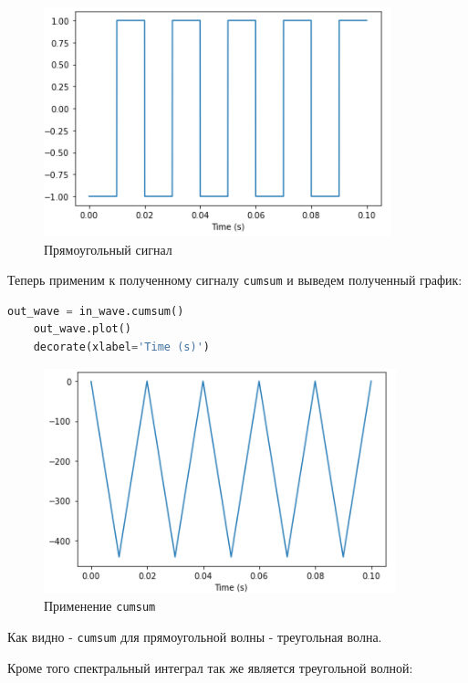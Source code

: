 \documentclass[a4paper]{article}
\begin{document}
            \begin{figure}[H]
                \centering
                \includegraphics{ex_3_1.png}
                \caption{Прямоугольный сигнал}
                \label{fig:ex_3_1}
            \end{figure}
            
            Теперь применим к полученному сигналу \texttt{cumsum} и выведем полученный график:
            
\begin{lstlisting}[language=Python, caption= Применение \texttt{cumsum}]
    out_wave = in_wave.cumsum()
    out_wave.plot()
    decorate(xlabel='Time (s)')
\end{lstlisting}
            
            \begin{figure}[H]
                \centering
                \includegraphics{ex_3_2.png}
                \caption{Применение \texttt{cumsum}}
                \label{fig:ex_3_2}
            \end{figure}
            
            Как видно - \texttt{cumsum} для прямоугольной волны - треугольная волна.
            
            Кроме того спектральный интеграл так же является треугольной волной:
            
\end{document}
